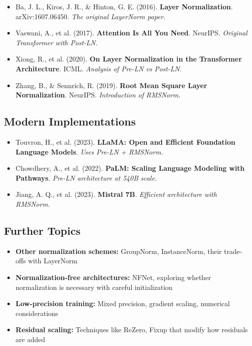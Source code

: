 \documentclass{article}
\begin{document}
\begin{itemize}
\item Ba, J. L., Kiros, J. R., \& Hinton, G. E. (2016). \textbf{Layer Normalization}. arXiv:1607.06450. \textit{The original LayerNorm paper.}

\item Vaswani, A., et al. (2017). \textbf{Attention Is All You Need}. NeurIPS. \textit{Original Transformer with Post-LN.}

\item Xiong, R., et al. (2020). \textbf{On Layer Normalization in the Transformer Architecture}. ICML. \textit{Analysis of Pre-LN vs Post-LN.}

\item Zhang, B., \& Sennrich, R. (2019). \textbf{Root Mean Square Layer Normalization}. NeurIPS. \textit{Introduction of RMSNorm.}
\end{itemize}

\subsection{Modern Implementations}

\begin{itemize}
\item Touvron, H., et al. (2023). \textbf{LLaMA: Open and Efficient Foundation Language Models}. \textit{Uses Pre-LN + RMSNorm.}

\item Chowdhery, A., et al. (2022). \textbf{PaLM: Scaling Language Modeling with Pathways}. \textit{Pre-LN architecture at 540B scale.}

\item Jiang, A. Q., et al. (2023). \textbf{Mistral 7B}. \textit{Efficient architecture with RMSNorm.}
\end{itemize}

\subsection{Further Topics}

\begin{itemize}
\item \textbf{Other normalization schemes:} GroupNorm, InstanceNorm, their trade-offs with LayerNorm

\item \textbf{Normalization-free architectures:} NFNet, exploring whether normalization is necessary with careful initialization

\item \textbf{Low-precision training:} Mixed precision, gradient scaling, numerical considerations

\item \textbf{Residual scaling:} Techniques like ReZero, Fixup that modify how residuals are added
\end{itemize}
\end{document}
